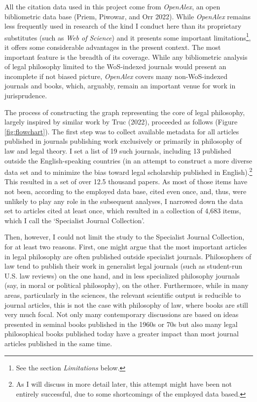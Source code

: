 \documentclass[
]{article}
\begin{document}
All the citation data used in this project come from \emph{OpenAlex}, an open bibliometric data base (Priem, Piwowar, and Orr 2022). While \emph{OpenAlex} remains less frequently used in research of the kind I conduct here than its proprietary substitutes (such as \emph{Web of Science}) and it presents some important limitations\footnote{See the section \emph{Limitations} below.}, it offers some considerable advantages in the present context. The most important feature is the breadth of its coverage. While any bibliometric analysis of legal philosophy limited to the WoS-indexed journals would present an incomplete if not biased picture, \emph{OpenAlex} covers many non-WoS-indexed journals and books, which, arguably, remain an important venue for work in jurisprudence.

The process of constructing the graph representing the core of legal philosophy, largely inspired by similar work by Truc (2022), proceeded as follows (Figure \ref{fig:flowchart}). The first step was to collect available metadata for all articles published in journals publishing work exclusively or primarily in philosophy of law and legal theory. I set a list of 19 such journals, including 13 published outside the English-speaking countries (in an attempt to construct a more diverse data set and to minimize the bias toward legal scholarship published in English).\footnote{As I will discuss in more detail later, this attempt might have been not entirely successful, due to some shortcomings of the employed data based.} This resulted in a set of over 12.5 thousand papers. As most of those items have not been, according to the employed data base, cited even once, and, thus, were unlikely to play any role in the subsequent analyses, I narrowed down the data set to articles cited at least once, which resulted in a collection of 4,683 items, which I call the `Specialist Journal Collection'.

Then, however, I could not limit the study to the Specialist Journal Collection, for at least two reasons. First, one might argue that the most important articles in legal philosophy are often published outside specialist journals. Philosophers of law tend to publish their work in generalist legal journals (such as student-run U.S. law reviews) on the one hand, and in less specialized philosophy journals (say, in moral or political philosophy), on the other. Furthermore, while in many areas, particularly in the sciences, the relevant scientific output is reducible to journal articles, this is not the case with philosophy of law, where books are still very much focal. Not only many contemporary discussions are based on ideas presented in seminal books published in the 1960s or 70s but also many legal philosophical books published today have a greater impact than most journal articles published in the same time.
\end{document}
